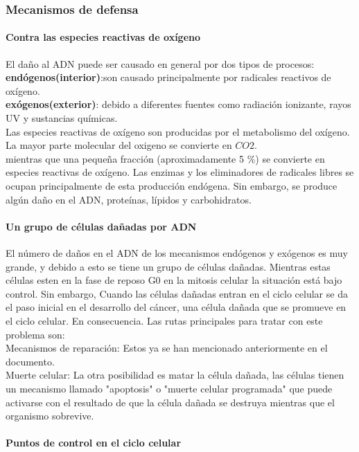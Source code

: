 \subsubsection{Mecanismos de defensa}
\paragraph{Contra las especies reactivas de oxígeno}
El daño al ADN puede ser causado en general por dos tipos de procesos:\\
 \textbf{endógenos(interior)}:son causado principalmente por radicales reactivos de oxígeno.\\
 \textbf{exógenos(exterior)}: debido a diferentes fuentes como radiación ionizante, rayos UV y sustancias químicas.\\
Las especies reactivas de oxígeno  son producidas por el metabolismo del oxígeno. La mayor parte molecular del oxigeno se convierte en $CO2$.\\
mientras que una pequeña fracción (aproximadamente 5 \%) se convierte en especies reactivas de oxígeno. Las enzimas y los eliminadores de radicales libres se ocupan principalmente de esta producción endógena. Sin embargo, se produce algún daño en el ADN, proteínas, lípidos y carbohidratos\cite{Thormod}.

\paragraph{Un grupo de células dañadas por ADN}

El número de daños en el ADN de los mecanismos endógenos y exógenos es muy grande, y debido a esto se tiene un grupo de células dañadas. Mientras estas células esten en la fase de reposo G0 en la mitosis celular la situación está bajo control. Sin embargo, Cuando las células dañadas entran en el ciclo celular se da el paso inicial en el desarrollo del cáncer, una célula dañada que se promueve en el ciclo celular. En consecuencia. Las rutas principales para tratar con este problema son:\\
Mecanismos de reparación: Estos ya se han mencionado anteriormente en el documento.\\
Muerte celular: La otra posibilidad es matar la célula dañada, las células tienen un mecanismo llamado "apoptosis" o "muerte celular programada" que puede activarse con el resultado de que la célula dañada se destruya mientras que el organismo sobrevive\cite{Thormod}.

\paragraph{Puntos de control en el ciclo celular}

